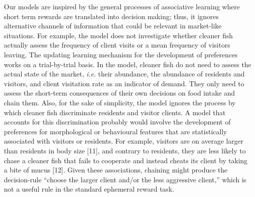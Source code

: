 \documentclass[10pt,letterpaper]{article}
\begin{document}
Our models are inspired by the general processes of associative learning
where short term rewards are translated into decision making; thus, it
ignores alternative channels of information that could be relevant in
market-like situations. For example, the model does not investigate
whether cleaner fish actually assess the frequency of client visits or a
mean frequency of visitors leaving. The updating learning mechanism for
the development of preferences works on a trial-by-trial basis. In the
model, cleaner fish do not need to assess the actual state of the
market, \emph{i.e.} their abundance, the abundance of residents and
visitors, and client visitation rate as an indicator of demand. They
only need to assess the short-term consequences of their own decisions
on food intake and chain them. Also, for the sake of simplicity, the
model ignores the process by which cleaner fish discriminate residents
and visitor clients. A model that accounts for this discrimination
probably would involve the development of preferences for morphological
or behavioural features that are statistically associated with visitors
or residents. For example, visitors are on average larger than residents
in body size {[}11{]}, and contrary to residents, they are less likely
to chase a cleaner fish that fails to cooperate and instead cheats its
client by taking a bite of mucus {[}12{]}. Given these associations,
chaining might produce the decision-rule ``choose the larger client
and/or the less aggressive client,'' which is not a useful rule in the
standard ephemeral reward task.
\end{document}
